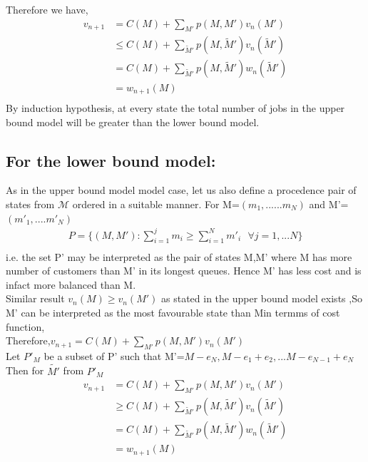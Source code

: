 \documentclass[a4paper,english,12pt]{article}
\begin{document}
Therefore we have,
\begin{align*}
v_{n+1}&=C(M)+\sum_{M'} p(M,M')v_n(M')\\
&\le C(M)+\sum_{\tilde M'}p(M,\tilde M')v_n(\tilde M')\\
&= C(M)+\sum_{\tilde M'}p(M,\tilde M')w_n(\tilde M')\\
&=w_{n+1}(M)\\
\end{align*}
By induction hypothesis, at every state the total number of jobs in the upper bound model will be greater than the lower bound model.
\subsection{For the lower bound model: }
As in the upper bound model model case, let us also define a procedence pair of states from $\mathcal{M}$ ordered in a suitable manner. For M=$(m_1,......m_N)$ and M'=$(m'_1,....m'_N)$ 
\begin{align*}
P = \{(M,M'): \sum_{i=1}^{j}m_i \ge \sum_{i=1}^{N}m'_i  \text{       }\forall j=1,...N \}\\
\end{align*}
i.e. the set P' may be interpreted as the pair of states M,M' where M has more number of customers than M' in its longest queues.
Hence M' has less cost and is infact more balanced than M. \\
Similar result $v_n(M) \ge v_n(M')$ as stated in the upper bound model exists ,So M' can be interpreted as the most favourable state than Min termms of cost function,\\
Therefore,$v_{n+1}=C(M)+\sum_{M'} p(M,M')v_n(M')$\\
Let $P'_M$ be a subset of P' such that M'=$M-e_N,M-e_1+e_2,... M-e_{N-1}+e_N$\\
Then for $\tilde{M'}$ from $P'_M$\\
\begin{align*}
v_{n+1}&=C(M)+\sum_{M'} p(M,M')v_n(M')\\
&\ge C(M)+\sum_{\tilde M'}p(M,\tilde M')v_n(\tilde M')\\
&= C(M)+\sum_{\tilde M'}p(M,\tilde M')w_n(\tilde M')\\
&=w_{n+1}(M)\\
\end{align*}
\end{document}
